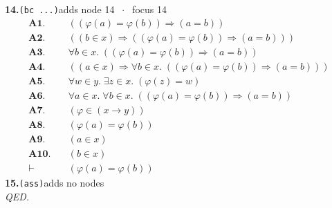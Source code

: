 \documentclass[11pt]{article}
\begin{document}
\medskip\noindent\textbf{14.}\quad \texttt{(bc ...)}\hfill{\small adds node 14 $\;\cdot\;$ focus 14}\\[2pt]
\begin{align*}
  \mathbf{A1.}\quad & ((\varphi(a) = \varphi(b)) \Rightarrow (a = b)) \\
  \mathbf{A2.}\quad & ((b \in x) \Rightarrow ((\varphi(a) = \varphi(b)) \Rightarrow (a = b))) \\
  \mathbf{A3.}\quad & \forall b \in x.\; ((\varphi(a) = \varphi(b)) \Rightarrow (a = b)) \\
  \mathbf{A4.}\quad & ((a \in x) \Rightarrow \forall b \in x.\; ((\varphi(a) = \varphi(b)) \Rightarrow (a = b))) \\
  \mathbf{A5.}\quad & \forall w \in y.\; \exists z \in x.\; (\varphi(z) = w) \\
  \mathbf{A6.}\quad & \forall a \in x.\; \forall b \in x.\; ((\varphi(a) = \varphi(b)) \Rightarrow (a = b)) \\
  \mathbf{A7.}\quad & (\varphi \in (x \to y)) \\
  \mathbf{A8.}\quad & (\varphi(a) = \varphi(b)) \\
  \mathbf{A9.}\quad & (a \in x) \\
  \mathbf{A10.}\quad & (b \in x) \\
  \vdash\quad & (\varphi(a) = \varphi(b))
\end{align*}
\medskip\noindent\textbf{15.}\quad \texttt{(ass)}\hfill{\small adds no nodes}\\[2pt]
\emph{QED.}\par
\end{document}
